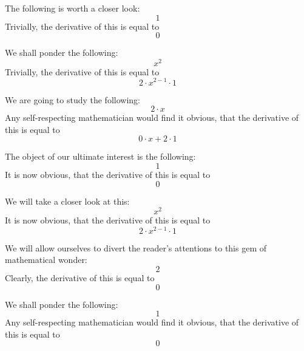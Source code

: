 \documentclass{article}
\begin{document}
The following is worth a closer look:
\begin{equation}
1 
\end{equation}
Trivially, the derivative of this is equal to
\begin{equation}
0 
\end{equation}

We shall ponder the following:
\begin{equation}
x ^{2 } 
\end{equation}
Trivially, the derivative of this is equal to
\begin{equation}
2 \cdot x ^{2 - 1 } \cdot 1 
\end{equation}

We are going to study the following:
\begin{equation}
2 \cdot x 
\end{equation}
Any self-respecting mathematician would find it obvious, that the derivative of this is equal to
\begin{equation}
0 \cdot x + 2 \cdot 1 
\end{equation}

The object of our ultimate interest is the following:
\begin{equation}
1 
\end{equation}
It is now obvious, that the derivative of this is equal to
\begin{equation}
0 
\end{equation}

We will take a closer look at this:
\begin{equation}
x ^{2 } 
\end{equation}
It is now obvious, that the derivative of this is equal to
\begin{equation}
2 \cdot x ^{2 - 1 } \cdot 1 
\end{equation}

We will allow ourselves to divert the reader's attentions to this gem of mathematical wonder:
\begin{equation}
2 
\end{equation}
Clearly, the derivative of this is equal to
\begin{equation}
0 
\end{equation}

We shall ponder the following:
\begin{equation}
1 
\end{equation}
Any self-respecting mathematician would find it obvious, that the derivative of this is equal to
\begin{equation}
0 
\end{equation}
\end{document}
